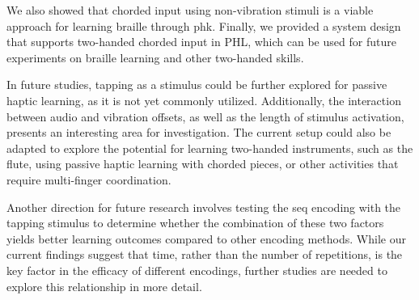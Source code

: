 We also showed that chorded input using non-vibration stimuli is a viable approach for learning braille through \gls{phk}. Finally, we provided a system design that supports two-handed chorded input in PHL, which can be used for future experiments on braille learning and other two-handed skills.

In future studies, tapping as a stimulus could be further explored for passive haptic learning, as it is not yet commonly utilized. Additionally, the interaction between audio and vibration offsets, as well as the length of stimulus activation, presents an interesting area for investigation. The current setup could also be adapted to explore the potential for learning two-handed instruments, such as the flute, using passive haptic learning with chorded pieces, or other activities that require multi-finger coordination.

Another direction for future research involves testing the \gls{seq} encoding with the tapping stimulus to determine whether the combination of these two factors yields better learning outcomes compared to other encoding methods. While our current findings suggest that time, rather than the number of repetitions, is the key factor in the efficacy of different encodings, further studies are needed to explore this relationship in more detail.

